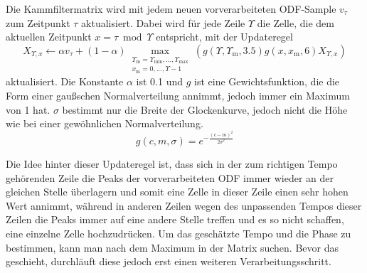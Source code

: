 {{			%
			Die Kammfiltermatrix wird mit jedem neuen vorverarbeiteten ODF-Sample $v_\tau$ zum Zeitpunkt $\tau$ aktualisiert.
			Dabei wird für jede Zeile $\Upsilon$ die Zelle,
				die dem aktuellen Zeitpunkt $x = \tau \bmod \Upsilon$ entspricht,
				mit der Updateregel
				\begin{equation}
					X_{\Upsilon, x} \leftarrow
						\alpha v_\tau +
						(1 - \alpha) \max_{
							\substack{
								\Upsilon_\text{m} = \Upsilon_{\text{min}}, ..., \Upsilon_{\text{max}} \\
								x_\text{m} = 0, ..., \Upsilon - 1
							}
						}
						(g(\Upsilon, \Upsilon_\text{m}, 3.5) g(x, x_\text{m}, 6) X_{\Upsilon, x})
				\end{equation}
				aktualisiert.
			Die Konstante $\alpha$ ist \num{0.1}
				und $g$ ist eine Gewichtsfunktion,
				die die Form einer gau{\ss}schen Normalverteilung annimmt,
				jedoch immer ein Maximum von \num{1} hat.
			$\sigma$ bestimmt nur die Breite der Glockenkurve,
				jedoch nicht die Höhe wie bei einer gewöhnlichen Normalverteilung.
			\begin{equation}
				g(c, m, \sigma) = e^{-\frac{(c - m)^2}{2\sigma^2}}
			\end{equation}

			Die Idee hinter dieser Updateregel ist,
				dass sich in der zum richtigen Tempo gehörenden Zeile
				die Peaks der vorverarbeiteten ODF immer wieder an der gleichen Stelle überlagern
				und somit eine Zelle in dieser Zeile einen sehr hohen Wert annimmt,
				während in anderen Zeilen
				wegen des unpassenden Tempos dieser Zeilen
				die Peaks immer auf eine andere Stelle treffen
				und es so nicht schaffen,
				eine einzelne Zelle hochzudrücken.
			Um das geschätzte Tempo und die Phase zu bestimmen,
				kann man nach dem Maximum in der Matrix suchen.
			Bevor das geschieht,
				durchläuft diese jedoch erst einen weiteren Verarbeitungsschritt.

}}
